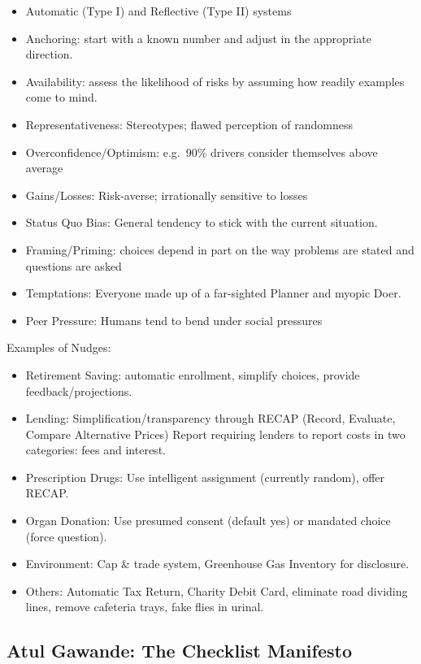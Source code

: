 \documentclass[
]{article}
\begin{document}
\begin{itemize}
\item
  Automatic (Type I) and Reflective (Type II) systems
\item
  Anchoring: start with a known number and adjust in the appropriate
  direction.
\item
  Availability: assess the likelihood of risks by assuming how readily
  examples come to mind.
\item
  Representativeness: Stereotypes; flawed perception of randomness
\item
  Overconfidence/Optimism: e.g.~90\% drivers consider themselves above
  average
\item
  Gains/Losses: Risk-averse; irrationally sensitive to losses
\item
  Status Quo Bias: General tendency to stick with the current situation.
\item
  Framing/Priming: choices depend in part on the way problems are stated
  and questions are asked
\item
  Temptations: Everyone made up of a far-sighted Planner and myopic
  Doer.
\item
  Peer Pressure: Humans tend to bend under social pressures
\end{itemize}

Examples of Nudges:

\begin{itemize}
\item
  Retirement Saving: automatic enrollment, simplify choices, provide
  feedback/projections.
\item
  Lending: Simplification/transparency through RECAP (Record, Evaluate,
  Compare Alternative Prices) Report requiring lenders to report costs
  in two categories: fees and interest.
\item
  Prescription Drugs: Use intelligent assignment (currently random),
  offer RECAP.
\item
  Organ Donation: Use presumed consent (default yes) or mandated choice
  (force question).
\item
  Environment: Cap \& trade system, Greenhouse Gas Inventory for
  disclosure.
\item
  Others: Automatic Tax Return, Charity Debit Card, eliminate road
  dividing lines, remove cafeteria trays, fake flies in urinal.
\end{itemize}

\hypertarget{atul-gawande-the-checklist-manifesto}{%
\subsection{Atul Gawande: The Checklist
Manifesto}\label{atul-gawande-the-checklist-manifesto}}
\end{document}
